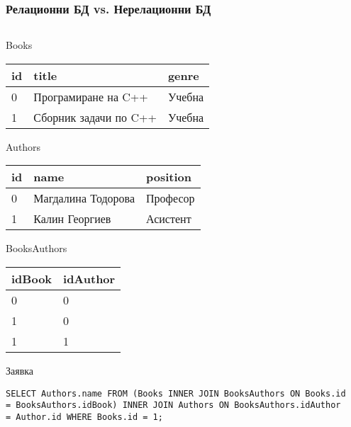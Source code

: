 \documentclass{beamer}
\begin{document}
\begin{frame}[fragile]
\frametitle{Релационни БД vs. Нерелационни БД}

\begin{columns}[t]
  \begin{column}{0.4\textwidth}




Books

\begin{tabular}{l l l}
id & title & genre \\ \hline
0 & Програмиране на C++ & Учебна \\
1 & Сборник задачи по C++ & Учебна
\end{tabular}

\vspace{0.2cm}

Authors

\begin{tabular}{l l l}
id & name & position \\ \hline
0 & Магдалина Тодорова &  Професор \\
1 & Калин Георгиев & Асистент
\end{tabular}


\vspace{0.2cm}

BooksAuthors

\begin{tabular}{l l}
idBook & idAuthor \\ \hline
0 & 0 \\
1 & 0 \\
1 & 1
\end{tabular}

\pause

\vspace{0.2cm}
Заявка


\begin{lstlisting}[breaklines=true]
SELECT Authors.name FROM (Books INNER JOIN BooksAuthors ON Books.id = BooksAuthors.idBook) INNER JOIN Authors ON BooksAuthors.idAuthor = Author.id WHERE Books.id = 1;
\end{lstlisting}

\end{column}

\pause

\begin{column}{0.5\textwidth}


\end{column}
\end{columns}
\end{frame}
\end{document}
